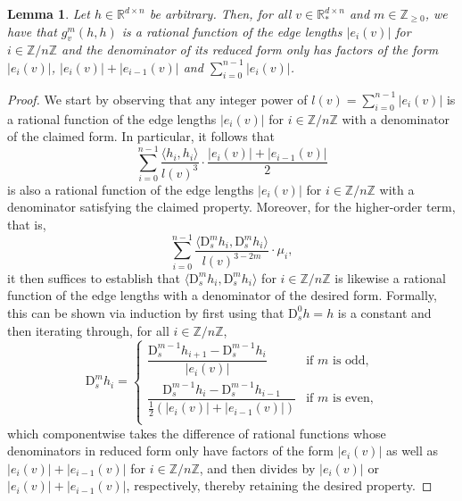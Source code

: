 \documentclass[11pt]{article}
\newtheorem{lemma}[thm]{Lemma}
\newcommand{\R}{\mathbb{R}}
\newcommand{\Z}{\mathbb{Z}}
\newcommand{\Db}{{\mathrm D}}
\begin{document}
\begin{lemma}\label{lem:rational_functions}
    Let $h\in\R^{d\times n}$ be arbitrary. Then, for all $v\in\R^{d\times n}_*$ and $m\in\Z_{\geq 0}$, we have that $g^m_v(h,h)$ is a rational function of the edge lengths $|e_i(v)|$ for $i\in \Z/n\Z$ and the denominator of its reduced form only has factors of the form $|e_i(v)|$, $|e_i(v)|+|e_{i-1}(v)|$ and $\sum_{i=0}^{n-1}|e_i(v)|$.
\end{lemma}
\begin{proof}
    We start by observing that any integer power of $l(v)=\sum_{i=0}^{n-1}|e_i(v)|$ is a rational function of the edge lengths $|e_i(v)|$ for $i\in \Z/n\Z$ with a denominator of the claimed form.
    In particular, it follows that
    \begin{displaymath}
        \sum_{i=0}^{n-1}\frac{\langle h_i,h_i\rangle}{l(v)^3} \cdot \frac{|e_i(v)|+|e_{i-1}(v)|}{2}
    \end{displaymath}
    is also a rational function of the edge lengths $|e_i(v)|$ for $i\in \Z/n\Z$ with a denominator satisfying the claimed property.
    Moreover, for the higher-order term, that is,
    \begin{displaymath}
        \sum_{i=0}^{n-1}\frac{\langle \Db_s^m h_i,\Db_s^m h_i\rangle}{l(v)^{3-2m}}\cdot\mu_i,
    \end{displaymath}
    it then suffices to establish that $\langle \Db_s^m h_i,\Db_s^m h_i\rangle$ for $i\in \Z/n\Z$ is likewise a rational function of the edge lengths with a denominator of the desired form. Formally, this can be shown via induction by first using that $\Db_s^0 h = h$ is a constant and then iterating through, for all $i\in \Z/n\Z$,
    \begin{displaymath}
        \Db_s^m h_i = \begin{cases} \dfrac{\Db_s^{m-1}h_{i+1} - \Db_s^{m-1}h_{i}}{|e_i(v)|}& \text{if } m \text{ is odd,}\\[1em] \dfrac{\Db_s^{m-1}h_{i} - \Db_s^{m-1}h_{i-1}}{\frac{1}{2}\left(|e_i(v)|+|e_{i-1}(v)|\right)} & \text{if } m \text{ is even,}\\ \end{cases}
    \end{displaymath}
    which componentwise takes the difference of rational functions whose denominators in reduced form only have factors of the form $|e_i(v)|$ as well as $|e_i(v)|+|e_{i-1}(v)|$ for $i\in \Z/n\Z$, and then divides by $|e_i(v)|$ or $|e_i(v)|+|e_{i-1}(v)|$, respectively, thereby retaining the desired property.
\end{proof}
\end{document}
